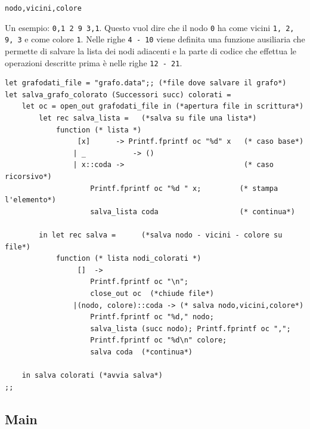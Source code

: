 \begin{center}
	\lstinline[style=cmd]|nodo,vicini,colore|
\end{center}

Un esempio: \lstinline[style=cmd]|0,1 2 9 3,1|. Questo vuol dire che il nodo \lstinline[style=cmd]|0| ha come vicini \lstinline[style=cmd]|1, 2, 9, 3| e come colore \lstinline[style=cmd]|1|. Nelle righe \lstinline[style=cmd]|4 - 10| viene definita una funzione ausiliaria che permette di salvare la lista dei nodi adiacenti e la parte di codice che effettua le operazioni descritte prima è nelle righe \lstinline[style=cmd]|12 - 21|.

\begin{lstlisting}[style=caml, caption={Funzione che salva un grafo su file.}]
let grafodati_file = "grafo.data";; (*file dove salvare il grafo*)
let salva_grafo_colorato (Successori succ) colorati = 
	let oc = open_out grafodati_file in	(*apertura file in scrittura*)
		let rec salva_lista =   (*salva su file una lista*)
			function (* lista *)
				 [x]      -> Printf.fprintf oc "%d" x   (* caso base*)
				| _ 		  -> ()
				| x::coda ->                            (* caso ricorsivo*)            
					Printf.fprintf oc "%d " x;         (* stampa l'elemento*)
					salva_lista coda                   (* continua*)
				
		in let rec salva =      (*salva nodo - vicini - colore su file*)
			function (* lista nodi_colorati *)
				 []  -> 
				 	Printf.fprintf oc "\n"; 
				 	close_out oc  (*chiude file*)
				|(nodo, colore)::coda -> (* salva nodo,vicini,colore*)
					Printf.fprintf oc "%d," nodo; 
					salva_lista (succ nodo); Printf.fprintf oc ","; 
					Printf.fprintf oc "%d\n" colore; 
					salva coda	(*continua*)

	in salva colorati (*avvia salva*)
;;
\end{lstlisting}


\subsection{Main}

